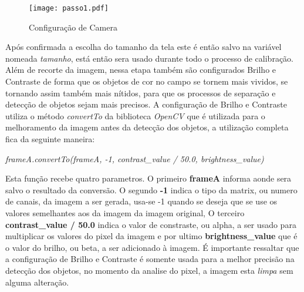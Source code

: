 \begin{figure}[H]
			\centering
			\texttt{[image: passo1.pdf]}
			\caption{ Configuração de Camera}
			\label{Configuracao}
		\end{figure}		


 Após confirmada a escolha do tamanho da tela 
este é então salvo na variável nomeada \textit{tamanho}, está então sera usado durante todo o processo de calibração.
Além de recorte da imagem, nessa etapa também são configurados Brilho e Contraste de forma que os objetos de cor no campo se tornem mais vividos, se tornando assim também mais nítidos, para que os processos de separação e detecção de objetos sejam mais precisos.	A configuração de Brilho e Contraste utiliza o método \textit{convertTo} da biblioteca \textit{OpenCV} que é utilizada para o melhoramento da imagem antes da detecção dos objetos, a utilização completa fica da seguinte maneira:
\begin{center}
\centering \textit{ frameA.convertTo(frameA, -1, contrast\_value / 50.0, brightness\_value)}
\end{center}
Esta função recebe quatro parametros. O primeiro \textbf{frameA} informa aonde sera salvo o resultado da conversão. O segundo \textbf{-1} indica o tipo da matrix, ou numero de canais, da imagem a ser gerada, usa-se -1 quando se deseja que se use os valores semelhantes aos da imagem da imagem original\cite{OpenCV}, O terceiro \textbf{contrast\_value / 50.0} indica o valor de constraste, ou alpha, a ser usado para multiplicar os valores do pixel da imagem\cite{OpenCV} e por ultimo \textbf{brightness\_value} que é o valor do brilho, ou beta, a ser adicionado à imagem. É importante ressaltar que a configuração de  Brilho e Contraste é somente usada para a melhor precisão na detecção dos objetos, no momento da analise do pixel, a imagem esta \textit{limpa} sem alguma alteração.\newline

